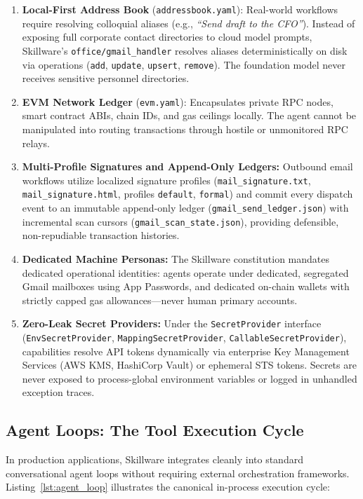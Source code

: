 \begin{enumerate}[leftmargin=*]
  \item \textbf{Local-First Address Book} (\texttt{addressbook.yaml}): Real-world workflows require resolving colloquial aliases (e.g., \emph{``Send draft to the CFO''}). Instead of exposing full corporate contact directories to cloud model prompts, Skillware's \texttt{office/gmail\_handler} resolves aliases deterministically on disk via operations (\texttt{add}, \texttt{update}, \texttt{upsert}, \texttt{remove}). The foundation model never receives sensitive personnel directories.
  \item \textbf{EVM Network Ledger} (\texttt{evm.yaml}): Encapsulates private RPC nodes, smart contract ABIs, chain IDs, and gas ceilings locally. The agent cannot be manipulated into routing transactions through hostile or unmonitored RPC relays.
  \item \textbf{Multi-Profile Signatures and Append-Only Ledgers:} Outbound email workflows utilize localized signature profiles (\texttt{mail\_signature.txt}, \texttt{mail\_signature.html}, profiles \texttt{default}, \texttt{formal}) and commit every dispatch event to an immutable append-only ledger (\texttt{gmail\_send\_ledger.json}) with incremental scan cursors (\texttt{gmail\_scan\_state.json}), providing defensible, non-repudiable transaction histories.
  \item \textbf{Dedicated Machine Personas:} The Skillware constitution mandates dedicated operational identities: agents operate under dedicated, segregated Gmail mailboxes using App Passwords, and dedicated on-chain wallets with strictly capped gas allowances---never human primary accounts.
  \item \textbf{Zero-Leak Secret Providers:} Under the \texttt{SecretProvider} interface (\texttt{EnvSecretProvider}, \texttt{MappingSecretProvider}, \texttt{CallableSecretProvider}), capabilities resolve API tokens dynamically via enterprise Key Management Services (AWS KMS, HashiCorp Vault) or ephemeral STS tokens. Secrets are never exposed to process-global environment variables or logged in unhandled exception traces.
\end{enumerate}

\subsection{Agent Loops: The Tool Execution Cycle}
\label{subsec:agent_loops}

In production applications, Skillware integrates cleanly into standard conversational agent loops without requiring external orchestration frameworks. Listing~\ref{lst:agent_loop} illustrates the canonical in-process execution cycle:

